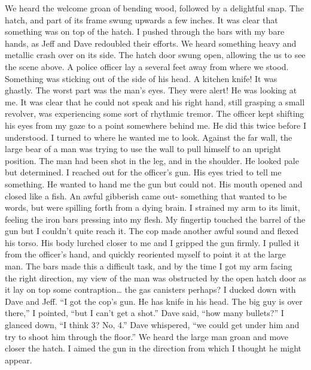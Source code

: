 \documentclass[a4paper]{article}
\begin{document}
We heard the welcome groan of bending wood, followed by a delightful snap. The hatch, and part of its frame swung upwards a few inches. It was clear that something was on top of the hatch.
I pushed through the bars with my bare hands, as Jeff and Dave redoubled their efforts. We heard something heavy and metallic crash over on its side. The hatch door swung open, allowing the us to see the scene above.
A police officer lay a several feet away from where we stood. Something was sticking out of the side of his head. A kitchen knife! It was ghastly. The worst part was the man’s eyes. They were alert! He was looking at me.
It was clear that he could not speak and his right hand, still grasping a small revolver, was experiencing some sort of rhythmic tremor.
The officer kept shifting his eyes from my gaze to a point somewhere behind me. He did this twice before I understood. I turned to where he wanted me to look. Against the far wall, the large bear of a man was trying to use the wall to pull himself to an upright position. The man had been shot in the leg, and in the shoulder. He looked pale but determined.
I reached out for the officer’s gun. His eyes tried to tell me something. He wanted to hand me the gun but could not. His mouth opened and closed like a fish. An awful gibberish came out- something that wanted to be words, but were spilling forth from a dying brain.
I strained my arm to its limit, feeling the iron bars pressing into my flesh. My fingertip touched the barrel of the gun but I couldn’t quite reach it. The cop made another awful sound and flexed his torso. His body lurched closer to me and I gripped the gun firmly. I pulled it from the officer’s hand, and quickly reoriented myself to point it at the large man. The bars made this a difficult task, and by the time I got my arm facing the right direction, my view of the man was obstructed by the open hatch door as it lay on top some contraption… the gas canisters perhaps?
I ducked down with Dave and Jeff. “I got the cop's gun. He has knife in his head. The big guy is over there,” I pointed, “but I can’t get a shot.”
Dave said, “how many bullets?”
I glanced down, “I think 3? No, 4.”
Dave whispered, “we could get under him and try to shoot him through the floor.”
We heard the large man groan and move closer the hatch. I aimed the gun in the direction from which I thought he might appear.
\end{document}
